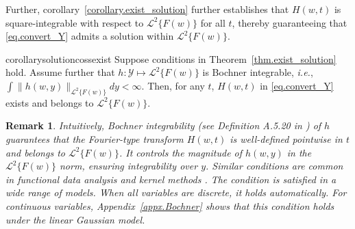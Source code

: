 \documentclass[
  12pt]{article}
\newtheorem{remark}{Remark}
\def\to{\rightarrow}
\def\cL{\mathcal{L}}
\def\cY{\mathcal{Y}}
\begin{document}

Further, corollary~\ref{corollary.exist_solution} further establishes that $H(w,t)$ is square-integrable with respect to $\mathcal{L}^2\{F(w)\}$ for all $t$, thereby guaranteeing that \eqref{eq.convert_Y} admits a solution within $\mathcal{L}^2\{F(w)\}$. 


\begin{restatable}{corollary}{solutioncossexist}
\label{corollary.exist_solution}
Suppose conditions in Theorem~\ref{thm.exist_solution} hold. Assume further that $h: \cY \mapsto \cL^2\{F(w)\}$ is Bochner integrable, \emph{i.e.}, $\int \|h(w,y)\|_{\cL^2\{F(w)\}}dy<\infty$. Then, for any $t$, $H(w,t)$ in \eqref{eq.convert_Y} exists and belongs to $\mathcal{L}^2\{F(w)\}$.
\end{restatable}
\begin{remark}
Intuitively, Bochner integrability (see Definition A.5.20 in \cite{steinwart2008support}) of $h$ guarantees that the Fourier-type transform $H(w,t)$ is well-defined pointwise in $t$ and belongs to $\cL^2\{F(w)\}$. It controls the magnitude of $h(w,y)$ in the $\cL^2\{F(w)\}$ norm, ensuring integrability over $y$. Similar conditions are common in functional data analysis and kernel methods \citep{jeon2020additive,mastouri2021proximal}. The condition is satisfied in a wide range of models. When all variables are discrete, it holds automatically. For continuous variables, Appendix~\ref{appx.Bochner} shows that this condition holds under the linear Gaussian model. 
\end{remark}
\end{document}
